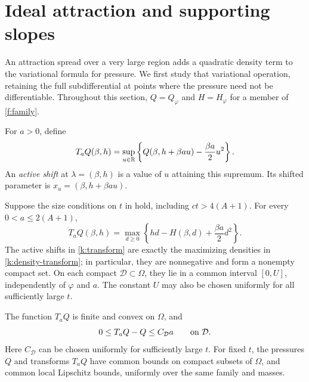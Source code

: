 \section{Ideal attraction and supporting slopes}
\label{k:section-transform}

An attraction spread over a very large region adds a quadratic density term
to the variational formula for pressure.  We first study that variational
operation, retaining the full subdifferential at points where the pressure
need not be differentiable.  Throughout this section, $Q=Q_\varphi$ and
$H=H_\varphi$ for a member of \eqref{f:family}.

\begin{definition}
For $a>0$, define
\begin{equation}
 T_aQ(\beta,h)
 =\sup_{u\in\mathbb R}\left\{
 Q(\beta,h+\beta au)-\frac{\beta a}{2}u^2\right\}.
 \label{k:transform}
\end{equation}
An \emph{active shift} at $\lambda=(\beta,h)$ is a value of $u$ attaining
this supremum.  Its shifted parameter is
$x_u=(\beta,h+\beta au)$.
\end{definition}

\begin{proposition}
\label{k:transform-properties}
Suppose the size conditions on $t$ in  hold, including
$ct>4(A+1)$.  For every $0<a\le 2(A+1)$,
\begin{equation}
 T_aQ(\beta,h)
 =\max_{d\ge0}
 \left\{hd-H(\beta,d)+\frac{\beta a}{2}d^2\right\}.
 \label{k:density-transform}
\end{equation}
The active shifts in \eqref{k:transform} are exactly the maximizing
densities in \eqref{k:density-transform}; in particular, they are
nonnegative and form a nonempty compact set.  On each compact
$\mathcal D\subset\Omega$, they lie in a common interval $[0,U]$,
independently of $\varphi$ and $a$.  The constant $U$ may also be chosen
uniformly for all sufficiently large $t$.

The function $T_aQ$ is finite and convex on $\Omega$, and
\begin{equation}
 0\le T_aQ-Q\le C_{\mathcal D}a
 \qquad\hbox{on }\mathcal D.
 \label{k:small-mass}
\end{equation}
Here $C_{\mathcal D}$ can be chosen uniformly for sufficiently large $t$.
For fixed $t$, the pressures $Q$ and transforms $T_aQ$ have common bounds
on compact subsets of $\Omega$, and common local Lipschitz bounds,
uniformly over the same family and masses.
\end{proposition}

